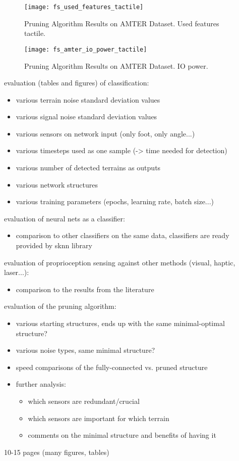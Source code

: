 \begin{figure}[H]
  \centering
  \texttt{[image: fs\_used\_features\_tactile]}
  \caption{Pruning Algorithm Results on AMTER Dataset. Used features tactile.}
  \label{fig:pa_amter_used_features_tactile}
\end{figure}

\begin{figure}[H]
  \centering
  \texttt{[image: fs\_amter\_io\_power\_tactile]}
  \caption{Pruning Algorithm Results on AMTER Dataset. IO power.}
  \label{fig:pa_amter_io_power_tactile}
\end{figure}



evaluation (tables and figures) of classification:
\begin{itemize}
\item various terrain noise standard deviation values
\item various signal noise standard deviation values
\item various sensors on network input (only foot, only angle...)
\item various timesteps used as one sample (-> time needed for detection)
\item various number of detected terrains as outputs
\item various network structures
\item various training parameters (epochs, learning rate, batch size...)
\end{itemize}


evaluation of neural nets as a classifier:
\begin{itemize}
\item comparison to other classifiers on the same data, classifiers are ready provided by sknn library
\end{itemize}

evaluation of proprioception sensing against other methods (visual, haptic, laser...):
\begin{itemize}
\item comparison to the results from the literature
\end{itemize}

evaluation of the pruning algorithm:
\begin{itemize}
\item various starting structures, ends up with the same minimal-optimal structure?
\item various noise types, same minimal structure?
\item speed comparisons of the fully-connected vs. pruned structure
\item further analysis:
 \begin{itemize}
 \item which sensors are redundant/crucial
 \item which sensors are important for which terrain
 \item comments on the minimal structure and benefits of having it
 \end{itemize}
\end{itemize}
10-15 pages (many figures, tables)
